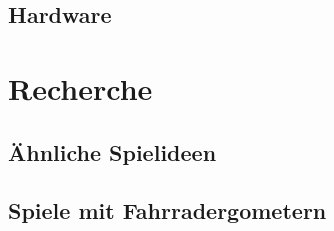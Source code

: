 
\section{Hardware}


 
\chapter{Recherche}
\section{Ähnliche Spielideen}


\section{Spiele mit Fahrradergometern}
\label{StateOfTheArt}









